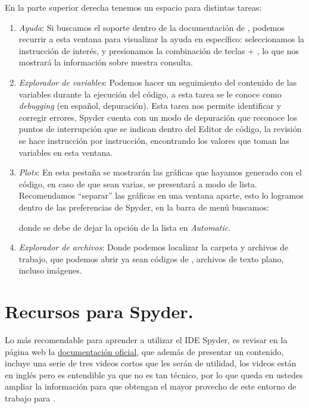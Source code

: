 En la parte superior derecha tenemos un espacio para distintas tareas:
\begin{enumerate}[label=\alph*)]
\item \textit{Ayuda}: Si buscamos el soporte dentro de la documentación de \python, podemos recurrir a esta ventana para visualizar la ayuda en específico: seleccionamos la instrucción de interés, y presionamos la combinación de teclas \keys{\ctrl} + , lo que nos mostrará la información sobre nuestra consulta.
\item \textit{Explorador de variables}: Podemos hacer un seguimiento del contenido de las variables durante la ejecución del código, a esta tarea se le conoce como \textit{debugging} (en español, depuración). Esta tarea nos permite identificar y corregir errores, Spyder cuenta con un modo de depuración que reconoce los puntos de interrupción que se indican dentro del Editor de código, la revisión se hace instrucción por instrucción, encontrando los valores que toman las variables en esta ventana.
\item \textit{Plots}: En esta pestaña se mostrarán las gráficas que hayamos generado con el código, en caso de que sean varias, se presentará a modo de lista. Recomendamos \enquote{separar} las gráficas en una ventana aparte, esto lo logramos dentro de las preferencias de Spyder, en la barra de menú buscamos:
\begin{center}
\end{center}
donde se debe de dejar la opción de la lista en \textit{Automatic.}
\item \textit{Explorador de archivos}: Donde podemos localizar la carpeta y archivos de trabajo, que podemos abrir ya sean códigos de \python, archivos de texto plano, incluso imágenes.
\end{enumerate}

\section{Recursos para Spyder.}

Lo más recomendable para aprender a utilizar el IDE Spyder, es revisar en la página web la \href{https://www.spyder-ide.org/}{documentación oficial}, que además de presentar un contenido, incluye una serie de tres videos cortos que les serán de utilidad, los videos están en inglés pero es entendible ya que no es tan técnico, por lo que queda en ustedes ampliar la información para que obtengan el mayor provecho de este entorno de trabajo para \python.


